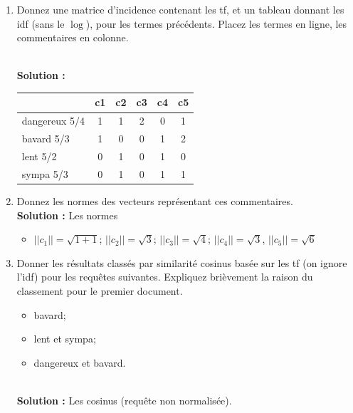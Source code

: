 \documentclass[10pt,a4paper]{article}
\newenvironment{solution}[0]{
~\\ \color{red} \textbf{Solution : }\color{black}}{%
}
\begin{document}
\begin{enumerate}
   \item Donnez une matrice d'incidence contenant les tf, 
      et un tableau donnant les idf (sans le $\log$), pour les  termes précédents. Placez
      les termes en ligne, les commentaires en colonne.

\begin{solution}
\begin{center}
\begin{tabular}{l|c|c|c|c|c}
            & \textbf{c1} & \textbf{c2} & \textbf{c3} &\textbf{c4}&\textbf{c5} \\ \hline  
   dangereux  5/4   & 1           & 1           & 2           & 0         & 1\\
   bavard 5/3  & 1           & 0           & 0           & 1         & 2\\
   lent 5/2  & 0           & 1           & 0           & 1         & 0\\
   sympa 5/3  & 0           & 1           & 0           & 1         & 1\\\hline
   \end{tabular}
\end{center}
\end{solution}

  \item Donnez les normes des vecteurs représentant ces commentaires.
\begin{solution}
Les normes
\begin{itemize}
  \item $||c_1|| = \sqrt{1+ 1}$; $||c_2|| = \sqrt{3}$; $||c_3|| = \sqrt{4}$; 
    $||c_4|| = \sqrt{3}$, $||c_5|| = \sqrt{6}$  
\end{itemize}
\end{solution}
  
  \item Donner les résultats classés par similarité cosinus basée sur les tf 
  (on ignore l'idf) pour les requêtes suivantes. Expliquez brièvement la raison
  du classement pour le premier document.
  
  \begin{itemize}
    \item bavard;
    \item lent et sympa;
    \item dangereux et bavard.
  \end{itemize}
\begin{solution}
Les cosinus (requête non normalisée).


\end{solution}
\end{enumerate}
\end{document}
